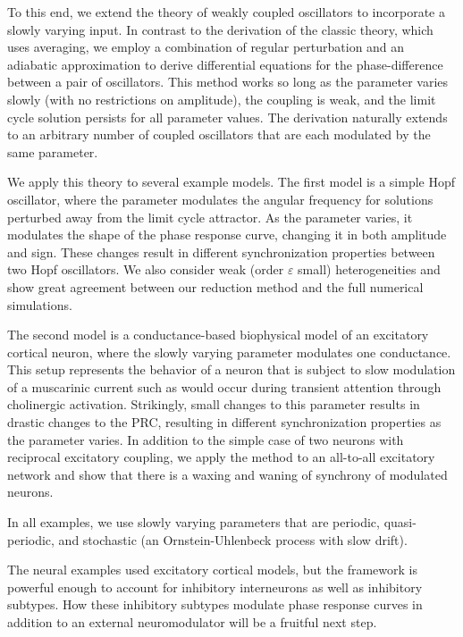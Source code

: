 \documentclass[a4paper,11pt]{article}
\begin{document}
To this end, we extend the theory of weakly coupled oscillators to incorporate a slowly varying input. In contrast to the derivation of the classic theory, which uses averaging, we employ a combination of regular perturbation and an adiabatic approximation to derive differential equations for the phase-difference between a pair of oscillators. This method works so long as the parameter varies slowly (with no restrictions on amplitude), the coupling is weak, and the limit cycle solution persists for all parameter values. The derivation naturally extends to an arbitrary number of coupled oscillators that are each modulated by the same parameter. 

We apply this theory to several example models. The first model is a simple Hopf oscillator, where the parameter modulates the angular frequency for solutions perturbed away from the limit cycle attractor. As the parameter varies, it modulates the shape of the phase response curve, changing it in both amplitude and sign. These changes result in different synchronization properties between two Hopf oscillators. We also consider weak (order $\varepsilon$ small) heterogeneities and show great agreement between our reduction method and the full numerical simulations.

The second model is a conductance-based biophysical model of an excitatory cortical neuron, where the slowly varying parameter modulates one conductance. This setup represents the behavior of a neuron that is subject to slow modulation of a muscarinic current such as would occur during transient attention through cholinergic activation. Strikingly, small changes to this parameter results in drastic changes to the PRC, resulting in different synchronization properties as the parameter varies. In addition to the simple case of two neurons with reciprocal excitatory coupling, we apply the method to an all-to-all excitatory network and show that there is a waxing and waning of synchrony of modulated neurons.

In all examples, we use slowly varying parameters that are periodic, quasi-periodic, and stochastic (an Ornstein-Uhlenbeck process with slow drift).

The neural examples used excitatory cortical models, but the framework is powerful enough to account for inhibitory interneurons as well as inhibitory subtypes. How these inhibitory subtypes modulate phase response curves in addition to an external neuromodulator will be a fruitful next step.

\end{document}
